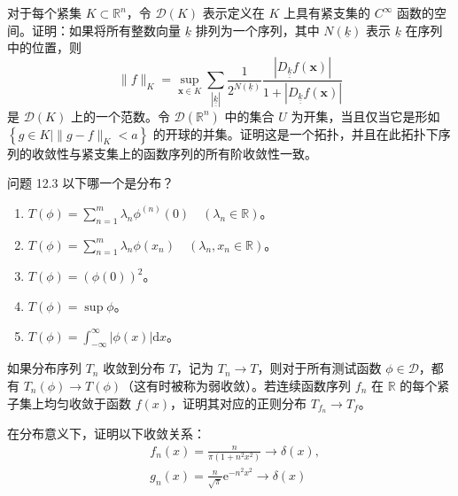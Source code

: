 \begin{problem}\label{pro:12.2}
   对于每个紧集 $K \subset \mathbb{R}^n$，令 $\mathcal{D}(K)$
表示定义在 $K$ 上具有紧支集的 $C^{\infty}$
函数的空间。证明：如果将所有整数向量 $\underline{k}$
排列为一个序列，其中 $N(\underline{k})$ 表示 $\underline{k}$
在序列中的位置，则
  $$
\|f\|_{K}=\sup _{\mathbf{x} \in K} \sum_{|\underline{\underline{k}}|} \frac{1}{2^{N(\underline{k})}} \frac{\left|D_{\underline{\underline{k}}} f(\mathbf{x})\right|}{1+\left|D_{\underline{\underline{k}}} f(\mathbf{x})\right|}
$$
是 $\mathcal{D}(K)$ 上的一个范数。令 $\mathcal{D}(\mathbb{R}^n)$
中的集合 $U$ 为开集，当且仅当它是形如
$\left\{g \in K \mid\|g-f\|_{K}<a\right\}$
的开球的并集。证明这是一个拓扑，并且在此拓扑下序列的收敛性与紧支集上的函数序列的所有阶收敛性一致。

\end{problem}
\begin{problem}\label{pro:12.3}
  问题 12.3 以下哪一个是分布？

\begin{enumerate}
\def\labelenumi{(\alph{enumi})}
\item
  $T(\phi)=\sum_{n=1}^{m} \lambda_{n} \phi^{(n)}(0) \quad\left(\lambda_{n} \in \mathbb{R}\right)$。
\item
  $T(\phi)=\sum_{n=1}^{m} \lambda_{n} \phi\left(x_{n}\right) \quad\left(\lambda_{n}, x_{n} \in \mathbb{R}\right)$。
\item
  $T(\phi)=(\phi(0))^{2}$。
\item
  $T(\phi)=\sup \phi$。
\item
  $T(\phi)=\int_{-\infty}^{\infty}|\phi(x)| \mathrm{d} x$。
\end{enumerate}

\end{problem}
\begin{problem}\label{pro:12.4}
  如果分布序列 $T_{n}$ 收敛到分布 $T$，记为
$T_{n} \rightarrow T$，则对于所有测试函数
$\phi \in \mathcal{D}$，都有
$T_{n}(\phi) \rightarrow T(\phi)$（这有时被称为弱收敛）。若连续函数序列
$f_n$ 在 $\mathbb{R}$ 的每个紧子集上均匀收敛于函数
$f(x)$，证明其对应的正则分布 $T_{f_n} \rightarrow T_{f}$。

在分布意义下，证明以下收敛关系：
 $$
\begin{aligned}
& f_{n}(x)=\frac{n}{\pi\left(1+n^{2} x^{2}\right)} \rightarrow \delta(x), \\
& g_{n}(x)=\frac{n}{\sqrt{\pi}} \mathrm{e}^{-n^{2} x^{2}} \rightarrow \delta(x)
\end{aligned}
$$
\end{problem}

